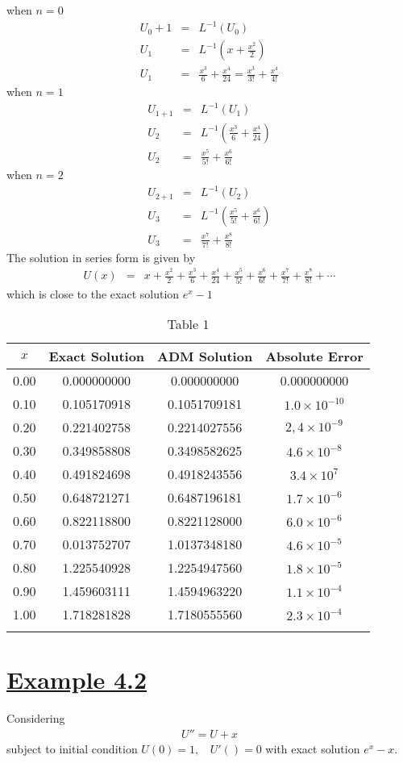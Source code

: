 \documentclass[11pt]{report}
\newcommand{\ubt}[1]{\textbf{\underline{#1}}}
\newcommand{\sps}{\\[0.2cm]}
\newcommand{\sprime}{'}
\newcommand{\dprime}{''}
\newcommand{\example}[1]{\section*{\ubt{Example #1}}}
\begin{document}
	when $n=0$
	\begin{eqnarray*}
		U_0+1&=& L^{-1}(U_0)\sps
		U_1 &=& L^{-1}\left(x + \frac{x^2}{2}\right)\sps
		U_1 &=& \frac{x^3}{6} + \frac{x^4}{24} = \frac{x^3}{3!} + \frac{x^4}{4!}
	\end{eqnarray*}
	when $n=1$
	\begin{eqnarray*}
		U_{1+1} &=& L^{-1}(U_1)\sps
		U_2 &=& L^{-1}\left(\frac{x^3}{6} + \frac{x^4}{24}\right)\sps
		U_2 &=& \frac{x^5}{5!} + \frac{x^6}{6!}
	\end{eqnarray*}
	when $n=2$
	\begin{eqnarray*}
		U_{2+1} &=& L^{-1}(U_2)\sps
		U_3 &=& L^{-1}\left(\frac{x^5}{5!} + \frac{x^6}{6!}\right)\sps
		U_3 &=&\frac{x^7}{7!} + \frac{x^8}{8!}
	\end{eqnarray*}
	The solution in series form is given by 
	\begin{eqnarray*}
		U(x)&=& x + \frac{x^2}{2}+\frac{x^3}{6} + \frac{x^4}{24} + \frac{x^5}{5!} + \frac{x^6}{6!} + \frac{x^7}{7!} + \frac{x^8}{8!}+ \cdots
	\end{eqnarray*}
	which is close to the exact solution $e^x - 1$
	\newpage
	\begin{longtable}{|c|c|c|c|}
		\hline
		$x$ & Exact Solution & ADM Solution & Absolute Error\\\hline
		0.00 & 0.000000000 & 0.000000000 & 0.000000000\\
		0.10 & 0.105170918 & 0.1051709181 & $1.0\times 10^{-10}$\\
		0.20 & 0.221402758 & 0.2214027556 & $2,4\times 10^{-9}$\\
		0.30 & 0.349858808 & 0.3498582625 & $4.6\times 10^{-8}$\\
		0.40 & 0.491824698 & 0.4918243556 & $3.4\times 10^{7}$\\
		0.50 & 0.648721271 & 0.6487196181 & $1.7\times 10^{-6}$\\
		0.60 & 0.822118800 & 0.8221128000 & $6.0\times 10^{-6}$\\
		0.70 & 0.013752707 & 1.0137348180 & $4.6\times 10^{-5}$\\
		0.80 & 1.225540928 & 1.2254947560 & $1.8\times 10^{-5}$\\
		0.90 & 1.459603111 & 1.4594963220 & $1.1\times 10^{-4}$\\
		1.00 & 1.718281828 & 1.7180555560 & $2.3\times 10^{-4}$\\\hline
		\caption{Table 1}
	\end{longtable}

	\example{4.2}
	Considering 
	\begin{eqnarray}
		U\dprime = U + x \label{eq:4_9}
	\end{eqnarray}
	subject to initial condition $U(0) =1,~~~~ U\sprime()=0$ with exact solution $e^x - x$.
	
\end{document}
